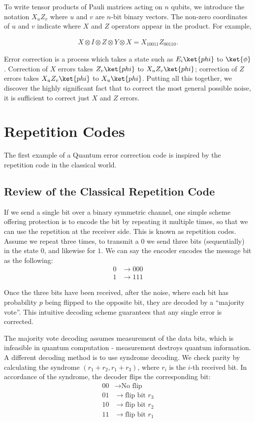 To write tensor products of Pauli matrices acting on \(n\) qubits, we introduce the notation \(X_uZ_v\) where \(u\) and \(v\) are \(n\)-bit binary vectors. The non-zero coordinates of \(u\) and \(v\) indicate where \(X\) and \(Z\) operators appear in the product. For example,

\begin{align}
    X \otimes I \otimes Z \otimes Y \otimes X = X_{10011} Z_{00110}.
\end{align}

Error correction is a process which takes a state such as \(E_i\ket{phi}\) to \(\ket{\phi}\). Correction of \(X\) errors takes \(Z_v\ket{phi}\)  to \(X_uZ_v\ket{phi}\); correction of \(Z\) errors takes \(X_uZ_v\ket{phi}\)  to \(X_u\ket{phi}\). Putting all this together, we discover the highly significant fact that to correct the most general possible noise, it is sufficient to correct just \(X\) and \(Z\) errors.


\section{Repetition Codes}
The first example of a Quantum error correction code is inspired by the repetition code in the classical world. 

\subsection{Review of the Classical Repetition Code}
If we send a single bit over a binary symmetric channel, one simple scheme offering protection is to encode the bit by repeating it multiple times, so that we can use the repetition at the receiver side. This is known as repetition codes. Assume we repeat three times, to transmit a \(0\) we send three bits (sequentially) in the state \(0\), and likewise for \(1\). We can say the encoder encodes the message bit as the following:
\begin{align*}
    0 &\rightarrow 000 \\
    1 &\rightarrow 111      
\end{align*}

Once the three bits have been received, after the noise, where each bit has probability \(p\) being flipped to the opposite bit, they are decoded by a “majority vote”. This intuitive decoding scheme guarantees that any single error is corrected. 

The majority vote decoding assumes measurement of the data bits, which is infeasible in quantum computation - measurement destroys quantum information. A different decoding method is to use syndrome decoding. We check parity by calculating the syndrome \((r_1+r_2, r_1+r_3)\), where \(r_i\) is the \(i\)-th received bit. In accordance of the syndrome, the decoder flips the corresponding bit: 
\begin{align*}
    00 &\rightarrow \text{No flip}   \\
    01 &\rightarrow \text{flip bit \(r_3\)} \\    
    10 &\rightarrow \text{flip bit \(r_2\)} \\  
    11 &\rightarrow \text{flip bit \(r_1\)}     
\end{align*}


